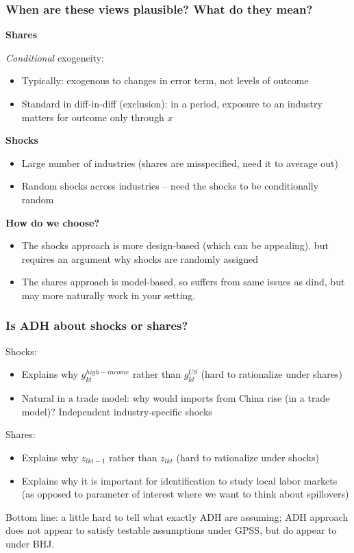 \documentclass[notes,11pt, aspectratio=169]{beamer}
\begin{document}
\begin{frame}
\frametitle{When are these views plausible? What do they mean?}


\textbf{Shares}

\textit{Conditional} exogeneity:
\begin{itemize}
\item Typically: exogenous to changes in error term, not levels of outcome
\item Standard in diff-in-diff (exclusion): in a period, exposure to an industry matters for outcome only through $x$
\end{itemize}


\textbf{Shocks}

\begin{itemize}
\item Large number of industries (shares are misspecified, need it to average out)
\item Random shocks across industries -- need the shocks to be conditionally random
\end{itemize}


\textbf{How do we choose?}
\begin{itemize}
\item The shocks approach is more design-based (which can be
  appealing), but requires an argument why shocks are randomly
  assigned
\item The shares approach is model-based, so suffers from same issues
  as dind, but may more naturally work in your setting.
\end{itemize}

\end{frame}

\begin{frame}
\frametitle{Is ADH about shocks or shares?}

Shocks:
\begin{itemize}
\item  Explains why $g_{kt}^{high-income}$ rather than $g_{kt}^{US}$  (hard to rationalize under shares)
\item Natural in a trade model: why would imports from China rise (in a trade model)?  Independent industry-specific shocks
\end{itemize}

Shares:
\begin{itemize}
\item Explains why $z_{lkt-1}$ rather than $z_{lkt}$ (hard to rationalize under shocks)
\item Explains why it is important for identification to study local labor markets (as opposed to parameter of interest where we want to think about spillovers)
\end{itemize}

\medskip

Bottom line: a little hard to tell what exactly ADH are assuming; ADH approach does not appear to satisfy testable assumptions under GPSS, but do appear to under BHJ.
\end{frame}
\end{document}
